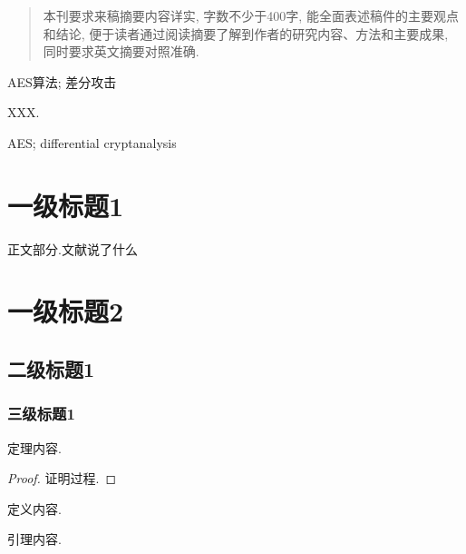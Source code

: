 \documentclass[final]{jcr}
\begin{document}
\begin{frontmatter}

  \begin{abstract}
    本刊要求来稿摘要内容详实, 字数不少于400字, 能全面表述稿件的主要观点和结论, 便于读者通过阅读摘要了解到作者的研究内容、方法和主要成果, 同时要求英文摘要对照准确.
  \end{abstract}

  \begin{keywords}
    AES算法; 差分攻击
  \end{keywords}

  \begin{eabstract}
    XXX.
  \end{eabstract}

  \begin{ekeywords}
    AES; differential cryptanalysis
  \end{ekeywords}
\end{frontmatter}

\section{一级标题1}

正文部分.文献\cite{1}说了什么

\section{一级标题2}
\subsection{二级标题1}
\subsubsection{三级标题1}

\begin{theorem}
	定理内容.
\end{theorem}

\begin{proof}
	证明过程.
\end{proof}

\begin{definition}
	定义内容.
\end{definition}

\begin{lemma}
	引理内容.
\end{lemma}
\end{document}

